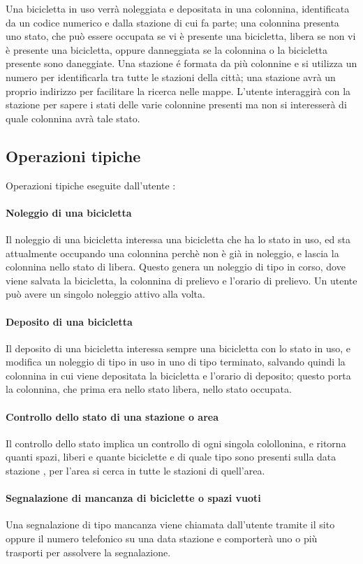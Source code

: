 \documentclass[a4paper,twoside]{article}
\begin{document}
Una bicicletta in uso verrà noleggiata e depositata in una colonnina, identificata da un codice numerico e dalla stazione di cui fa parte; una colonnina presenta uno stato, che può essere occupata se vi è presente una bicicletta, libera se non vi è presente una bicicletta, oppure danneggiata se la colonnina o la bicicletta presente sono daneggiate.\newline
Una stazione é formata da più colonnine e si utilizza un numero per identificarla tra tutte le stazioni della città; una stazione avrà un proprio indirizzo per facilitare la ricerca nelle mappe. L'utente interaggirà con la stazione per sapere i stati delle varie colonnine presenti ma non si interesserà di quale colonnina avrà tale stato.

\subsection{Operazioni tipiche}
Operazioni tipiche eseguite dall'utente :
\paragraph{Noleggio di una bicicletta} Il noleggio di una bicicletta interessa una bicicletta che ha lo stato in uso, ed sta attualmente occupando una colonnina perchè non è già in noleggio, e lascia la colonnina nello stato di libera. Questo genera un noleggio di tipo in corso, dove viene salvata la bicicletta, la colonnina di prelievo e l'orario di prelievo. Un utente può avere un singolo noleggio attivo alla volta.
\paragraph{Deposito di una bicicletta} Il deposito di una bicicletta interessa sempre una bicicletta con lo stato in uso, e modifica un noleggio di tipo in uso in uno di tipo terminato, salvando quindi la colonnina in cui viene depositata la bicicletta e l'orario di deposito; questo porta la colonnina, che prima era nello stato libera, nello stato occupata.
\paragraph{Controllo dello stato di una stazione o area} Il controllo dello stato implica un controllo di ogni singola colollonina, e ritorna quanti spazi, liberi e quante biciclette e di quale tipo sono presenti sulla data stazione , per l'area si cerca in tutte le stazioni di quell'area.
\paragraph{Segnalazione di mancanza di biciclette o spazi vuoti} Una segnalazione di tipo mancanza viene chiamata dall'utente tramite il sito oppure il numero telefonico su una data stazione e comporterà uno o più trasporti per assolvere la segnalazione.
\end{document}
